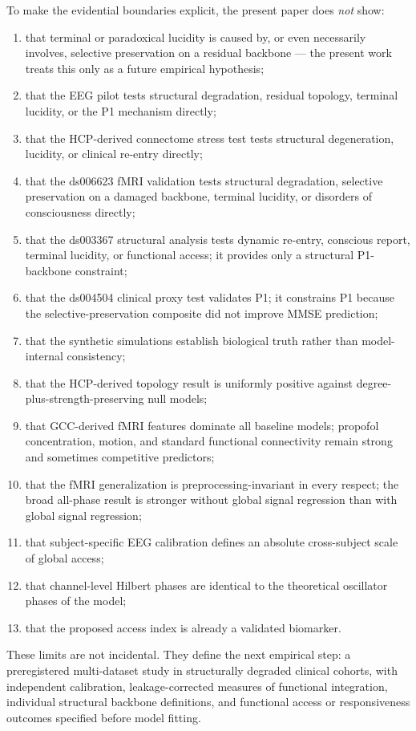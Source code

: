 \documentclass[11pt,a4paper]{article}
\theoremstyle{plain}
\theoremstyle{definition}
\theoremstyle{remark}
\begin{document}
To make the evidential boundaries explicit, the present paper does \emph{not} show:
\begin{enumerate}
\item that terminal or paradoxical lucidity is caused by, or even necessarily involves, selective preservation on a residual backbone --- the present work treats this only as a future empirical hypothesis;
\item that the EEG pilot tests structural degradation, residual topology, terminal lucidity, or the P1 mechanism directly;
\item that the HCP-derived connectome stress test tests structural degeneration, lucidity, or clinical re-entry directly;
\item that the ds006623 fMRI validation tests structural degradation, selective preservation on a damaged backbone, terminal lucidity, or disorders of consciousness directly;
\item that the ds003367 structural analysis tests dynamic re-entry, conscious report, terminal lucidity, or functional access; it provides only a structural P1-backbone constraint;
\item that the ds004504 clinical proxy test validates P1; it constrains P1 because the selective-preservation composite did not improve MMSE prediction;
\item that the synthetic simulations establish biological truth rather than model-internal consistency;
\item that the HCP-derived topology result is uniformly positive against degree-plus-strength-preserving null models;
\item that GCC-derived fMRI features dominate all baseline models; propofol concentration, motion, and standard functional connectivity remain strong and sometimes competitive predictors;
\item that the fMRI generalization is preprocessing-invariant in every respect; the broad all-phase result is stronger without global signal regression than with global signal regression;
\item that subject-specific EEG calibration defines an absolute cross-subject scale of global access;
\item that channel-level Hilbert phases are identical to the theoretical oscillator phases of the model;
\item that the proposed access index is already a validated biomarker.
\end{enumerate}

These limits are not incidental. They define the next empirical step: a preregistered multi-dataset study in structurally degraded clinical cohorts, with independent calibration, leakage-corrected measures of functional integration, individual structural backbone definitions, and functional access or responsiveness outcomes specified before model fitting.
\end{document}
